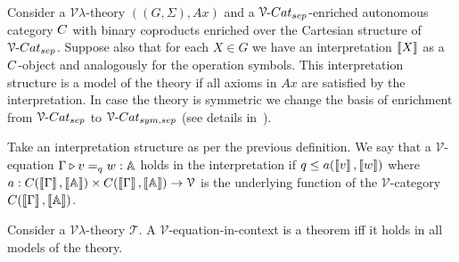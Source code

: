 \documentclass[a4paper,UKenglish,cleveref, autoref, thm-restate]{lipics-v2021}
\begin{document}
\begin{definition}\label{defn:model}
        Consider a $\mathcal{V}\lambda$-theory $((G,\Sigma),Ax)$ and a
        $\VCatSe$-enriched autonomous category $\catC$ with binary coproducts
        enriched over the Cartesian structure of $\VCatSe$.  Suppose also that
        for each $X \in G$ we have an interpretation $\left \llbracket X \right \rrbracket$ as a
        $\catC$-object and analogously for the operation symbols.  This
        interpretation structure is a model of the theory if all axioms in $Ax$
        are satisfied by the interpretation. In case the theory is symmetric we
        change the basis of enrichment from $\VCatSe$ to $\VCatSS$ (see details
        in~\cite{dahlqvist22,dahlqvist2023syntactic}).
\end{definition}
Take an interpretation structure as per the previous definition.  We say that a
$\mathcal{V}$-equation $\Gamma \triangleright v =_q w : \mathbb{A}$ holds in the
interpretation if $q \leq a(\left \llbracket v \right \rrbracket, \left \llbracket w \right \rrbracket)$ where $a :
\catC(\sem{\Gamma},\sem{\typeA}) \times \catC(\sem{\Gamma},\sem{\typeA}) \to
\mathcal{V}$ is the underlying function of the $\mathcal{V}$-category
$\catC(\sem{\Gamma},\sem{\typeA})$.


\begin{theorem}
        Consider a $\mathcal{V}\lambda$-theory $\mathscr{T}$.  A
        $\mathcal{V}$-equation-in-context is a theorem iff it holds in all
        models of the theory.
\end{theorem}
\end{document}
